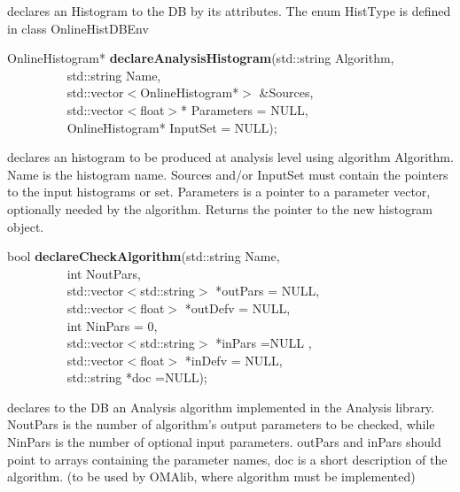  declares an Histogram to the DB by its attributes.  The enum HistType is defined in class OnlineHistDBEnv


\item    OnlineHistogram* {\bf declareAnalysisHistogram}(std::string Algorithm,\\\mbox{}~~~~~~~~~
                                            std::string Name,\\\mbox{}~~~~~~~~~
                                            std::vector$<$OnlineHistogram*$>$ \&Sources,\\\mbox{}~~~~~~~~~
                                            std::vector$<$float$>$* Parameters = NULL,\\\mbox{}~~~~~~~~~
                                            OnlineHistogram* InputSet = NULL);

 declares an histogram to be produced at analysis
 level using algorithm Algorithm. Name is the histogram name. Sources
 and/or InputSet must contain the pointers to the input histograms or set. 
 Parameters is a
 pointer to a parameter vector, optionally needed by the algorithm. 
 Returns the pointer to the new histogram object.


\item    bool {\bf declareCheckAlgorithm}(std::string Name,\\\mbox{}~~~~~~~~~ 
                             int NoutPars,\\\mbox{}~~~~~~~~~ 
                             std::vector$<$std::string$>$ *outPars = NULL,\\\mbox{}~~~~~~~~~
                             std::vector$<$float$>$ *outDefv = NULL,\\\mbox{}~~~~~~~~~
                             int NinPars = 0,\\\mbox{}~~~~~~~~~ 
                             std::vector$<$std::string$>$ *inPars =NULL ,\\\mbox{}~~~~~~~~~
                             std::vector$<$float$>$ *inDefv = NULL,\\\mbox{}~~~~~~~~~
                             std::string *doc =NULL);

 declares to the DB an Analysis algorithm implemented in the Analysis
 library. NoutPars is the number of algorithm's output parameters to be checked, 
 while NinPars is the number of optional input parameters.
 outPars and inPars should point to arrays containing the parameter names, 
 doc is a short description of the algorithm.
 (to be used by OMAlib, where algorithm must be implemented)



